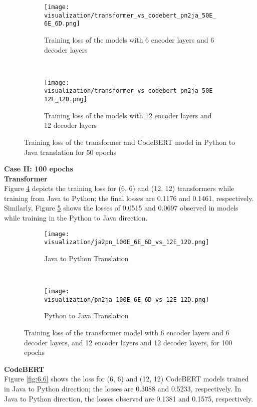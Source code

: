\begin{figure}[H]
\centering
  \begin{subfigure}[h]{0.45\textwidth}
    \texttt{[image: visualization/transformer\_vs\_codebert\_pn2ja\_50E\_6E\_6D.png]}
    \caption{Training loss of the models with 6 encoder layers and 6 decoder layers}
    \label{fig:6.4_a}
  \end{subfigure}
  ~
  \begin{subfigure}[h]{0.45\textwidth}
    \texttt{[image: visualization/transformer\_vs\_codebert\_pn2ja\_50E\_12E\_12D.png]}
    \caption{Training loss of the models with 12 encoder layers and 12 decoder layers}
    \label{fig:6.4_b}
  \end{subfigure}
\caption[Training loss of the transformer and CodeBERT model in Python to Java translation for 50 epochs]{Training loss of the transformer and CodeBERT model in Python to Java translation for 50 epochs}
\label{fig:6.4}
\end{figure}
\medskip
\smallskip
\textbf{Case II: 100 epochs} \\
\textbf{Transformer} \\
Figure \ref{fig:6.5_a} depicts the training loss for (6, 6) and (12, 12) transformers while training from Java to Python; the final losses are 0.1176 and 0.1461, respectively. Similarly, Figure \ref{fig:6.5_b} shows the losses of 0.0515 and 0.0697 observed in models while training in the Python to Java direction. 
\begin{figure}[H]
\centering
  \begin{subfigure}[h]{0.45\textwidth}
    \texttt{[image: visualization/ja2pn\_100E\_6E\_6D\_vs\_12E\_12D.png]}
    \caption{Java to Python Translation}
    \label{fig:6.5_a}
  \end{subfigure}
  ~
  \begin{subfigure}[h]{0.45\textwidth}
    \texttt{[image: visualization/pn2ja\_100E\_6E\_6D\_vs\_12E\_12D.png]}
    \caption{Python to Java Translation}
    \label{fig:6.5_b}
  \end{subfigure}
\caption[Training loss of the transformer model with 6 encoder layers and 6 decoder layers, and 12 encoder layers and 12 decoder layers, for 100 epochs]{Training loss of the transformer model with 6 encoder layers and 6 decoder layers, and 12 encoder layers and 12 decoder layers, for 100 epochs}
\label{fig:6.5}
\end{figure}
\medskip
\smallskip
\textbf{CodeBERT} \\
Figure \ref{fig:6.6} shows the loss for (6, 6) and (12, 12) CodeBERT models trained in Java to Python direction; the losses are 0.3088 and 0.5233, respectively. In Java to Python direction, the losses observed are 0.1381 and 0.1575, respectively.
